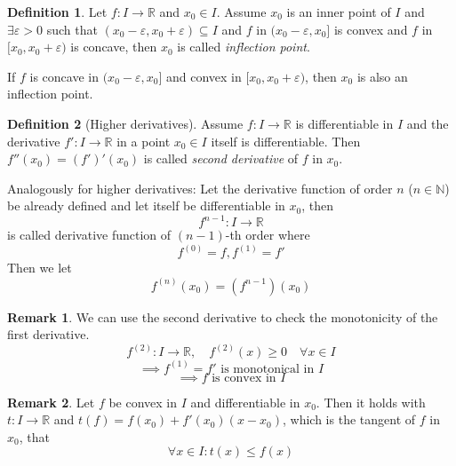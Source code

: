 \documentclass[a4paper,landscape,twocolumn]{article}
\theoremstyle{definition}
\newtheorem{defi}{Definition}
\newtheorem{rem}{Remark}
\begin{document}
%
\begin{defi}
  Let $f: I \to \mathbb R$ and $x_0 \in I$. Assume $x_0$ is an inner point of $I$
  and $\exists \varepsilon > 0$ such that $(x_0 - \varepsilon, x_0 + \varepsilon) \subseteq I$
  and $f$ in $(x_0 - \varepsilon, x_0]$ is convex and $f$ in $[x_0, x_0 + \varepsilon)$ is concave,
  then $x_0$ is called \emph{inflection point}.

  If $f$ is concave in $(x_0 - \varepsilon, x_0]$ and convex in $[x_0, x_0 + \varepsilon)$,
  then $x_0$ is also an inflection point.
\end{defi}
%
\begin{defi}[Higher derivatives]
  Assume $f: I \to \mathbb R$ is differentiable in $I$ and the derivative
  $f': I \to \mathbb R$ in a point $x_0 \in I$ itself is differentiable.
  Then $f''(x_0) = (f')'(x_0)$ is called \emph{second derivative} of $f$ in $x_0$.

  Analogously for higher derivatives:
  Let the derivative function of order $n$ ($n \in \mathbb N$) be already defined
  and let itself be differentiable in $x_0$, then
  \[ f^{n-1}: I \to \mathbb R \]
  is called derivative function of $(n-1)$-th order where
  \[ f^{(0)} = f, f^{(1)} = f' \]
  Then we let
  \[ f^{(n)}(x_0) = \left(f^{n-1}\right)(x_0) \]
\end{defi}
%
\begin{rem}
  We can use the second derivative to check the monotonicity of the first derivative.
  \[ f^{(2)}: I \to \mathbb R, \quad f^{(2)}(x) \geq 0 \quad \forall x \in I \]
  \[ \implies f^{(1)} = f' \text{ is monotonical in $I$} \]
  \[ \implies f \text{ is convex in $I$} \]
\end{rem}
\begin{rem}
  Let $f$ be convex in $I$ and differentiable in $x_0$. Then it holds with
  $t: I \to \mathbb R$ and $t(f) = f(x_0) + f'(x_0) (x - x_0)$,
  which is the tangent of $f$ in $x_0$, that
  \[ \forall x \in I: t(x) \leq f(x) \]
\end{rem}
%
\end{document}
